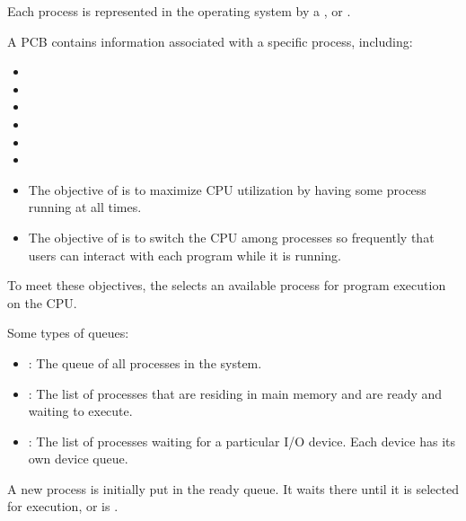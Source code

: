 
    \par Each process is represented in the operating system by a , or .
    \par A PCB contains information associated with a specific process,
    including:
      \begin{itemize}
        \item {}
        \item {}
        \item {}
        \item {}
        \item {}
        \item {}
      \end{itemize}



    \begin{itemize}
      \item The objective of  is to maximize CPU
        utilization by having some process running at all times.
      \item The objective of  is to switch the CPU among
        processes so frequently that users can interact with each program while
        it is running.
    \end{itemize}
    \par To meet these objectives, the  selects an
      available process for program execution on the CPU.

    \par Some types of queues:
      \begin{itemize}
        \item {}: The queue of all processes in the system.
        \item {}: The list of  processes that are residing in main
          memory and are ready and waiting to execute.
        \item {}: The list of processes waiting for a particular
          I/O device. Each device has its own device queue.
      \end{itemize}
    \par A new process is initially put in the ready queue. It waits there
      until it is selected for execution, or is .

